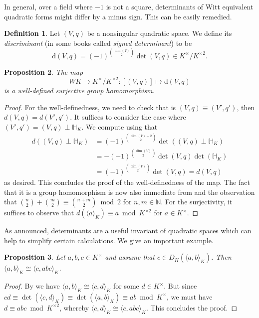 \documentclass[12pt, leqno, british]{amsart}
\theoremstyle{definition}
\newtheorem{defi}{Definition}[subsection]
\theoremstyle{plain}
\newtheorem{prop}[defi]{Proposition}
\theoremstyle{remark}
\newcommand{\mbb}{\mathbb}
\newcommand{\nat}{\mbb N}
\newcommand{\disc}{\mathrm{d}}
\begin{document}
In general, over a field where $-1$ is not a square, determinants of Witt equivalent quadratic forms might differ by a minus sign.
This can be easily remedied.
\begin{defi}
Let $(V, q)$ be a nonsingular quadratic space.
We define its \emph{discriminant} (in some books called \emph{signed determinant}) to be
$$ \disc(V, q) = (-1)^{\binom{\dim(V)}{2}} \det(V, q) \in K^\times/K^{\times 2}.$$
\end{defi}
\begin{prop}
The map
$$ WK \to K^\times/K^{\times 2} : [(V, q)] \mapsto \disc(V, q) $$
is a well-defined surjective group homomorphism.
\end{prop}
\begin{proof}
For the well-definedness, we need to check that is $(V, q) \equiv (V', q')$, then $d(V, q) = d(V', q')$.
It suffices to consider the case where $(V', q') = (V, q) \perp \mbb{H}_K$.
We compute using  that
\begin{align*}
d((V, q) \perp \mbb{H}_K) &= (-1)^{\binom{\dim(V)+2}{2}}\det((V, q) \perp \mbb{H}_K ) \\
&= - (-1)^{\binom{\dim(V)}{2}} \det(V, q) \det(\mbb{H}_K) \\
&= (-1)^{\binom{\dim(V)}{2}} \det(V, q) = d(V, q)
\end{align*}
as desired.
This concludes the proof of the well-definedness of the map.
The fact that it is a group homomorphism is now also immediate from  and the observation that $\binom{n}{2} + \binom{m}{2} \equiv \binom{n+m}{2} \bmod 2$ for $n, m \in \nat$.
For the surjectivity, it suffices to observe that $d(\langle a \rangle_K) \equiv a \bmod K^{\times 2}$ for $a \in K^\times$.
\end{proof}
As announced, determinants are a useful invariant of quadratic spaces which can help to simplify certain calculations.
We give an important example.
\begin{prop}
Let $a, b, c \in K^\times$ and assume that $c \in D_K(\langle a, b \rangle_K)$.
Then $\langle a, b \rangle_K \cong \langle c, abc \rangle_K$.
\end{prop}
\begin{proof}
By  we have $\langle a, b \rangle_K \cong \langle c, d \rangle_K$ for some $d \in K^\times$.
But since $cd \equiv \det(\langle c, d \rangle_K) \equiv \det(\langle a, b \rangle_K) \equiv ab \bmod K^\times$, we must have $d \equiv abc \bmod K^{\times 2}$, whereby $\langle c, d \rangle_K \cong \langle c, abc \rangle_K$.
This concludes the proof.
\end{proof}
\end{document}
